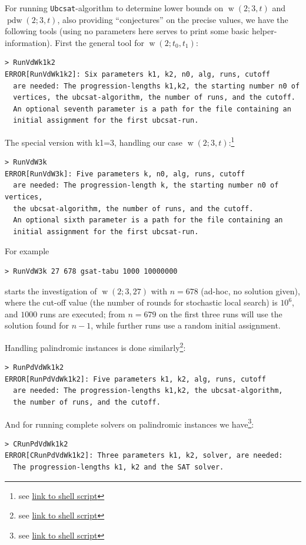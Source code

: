 \documentclass[final,3p,times]{elsarticle}
\theoremstyle{definition}
\DeclareMathOperator{\vdw}{w}
\DeclareMathOperator{\vdwpd}{pdw}
\begin{document}
\begin{appendix}
For running \texttt{Ubcsat}-algorithm to determine lower bounds on $\vdw(2;3,t)$ and $\vdwpd(2;3,t)$, also providing ``conjectures'' on the precise values, we have the following tools (using no parameters here serves to print some basic helper-information). First the general tool for $\vdw(2;t_0,t_1)$:
\begin{verbatim}
> RunVdWk1k2
ERROR[RunVdWk1k2]: Six parameters k1, k2, n0, alg, runs, cutoff
  are needed: The progression-lengths k1,k2, the starting number n0 of
  vertices, the ubcsat-algorithm, the number of runs, and the cutoff.
  An optional seventh parameter is a path for the file containing an
  initial assignment for the first ubcsat-run.
\end{verbatim}
The special version with k1=3, handling our case $\vdw(2;3,t)$:\footnote{see \href{https://github.com/OKullmann/oklibrary/blob/master/Experimentation/Investigations/RamseyTheory/VanderWaerdenProblems/RunVdW3k}{link to shell script}}
\begin{verbatim}
> RunVdW3k
ERROR[RunVdW3k]: Five parameters k, n0, alg, runs, cutoff
  are needed: The progression-length k, the starting number n0 of vertices,
  the ubcsat-algorithm, the number of runs, and the cutoff.
  An optional sixth parameter is a path for the file containing an
  initial assignment for the first ubcsat-run.
\end{verbatim}
For example
\begin{verbatim}
> RunVdW3k 27 678 gsat-tabu 1000 10000000
\end{verbatim}
starts the investigation of $\vdw(2;3,27)$ with $n=678$ (ad-hoc, no solution given), where the cut-off value (the number of rounds for stochastic local search) is $10^6$, and $1000$ runs are executed; from $n=679$ on the first three runs will use the solution found for $n-1$, while further runs use a random initial assignment.

Handling palindromic instances is done similarly\footnote{see \href{https://github.com/OKullmann/oklibrary/blob/master/Experimentation/Investigations/RamseyTheory/VanderWaerdenProblems/RunPdVdWk1k2}{link to shell script}}:
\begin{verbatim}
> RunPdVdWk1k2
ERROR[RunPdVdWk1k2]: Five parameters k1, k2, alg, runs, cutoff
  are needed: The progression-lengths k1,k2, the ubcsat-algorithm,
  the number of runs, and the cutoff.
\end{verbatim}

And for running complete solvers on palindromic instances we have\footnote{see \href{https://github.com/OKullmann/oklibrary/blob/master/Experimentation/Investigations/RamseyTheory/VanderWaerdenProblems/CRunPdVdWk1k2}{link to shell script}}:
\begin{verbatim}
> CRunPdVdWk1k2
ERROR[CRunPdVdWk1k2]: Three parameters k1, k2, solver, are needed:
  The progression-lengths k1, k2 and the SAT solver.
\end{verbatim}

\end{appendix}
\end{document}
